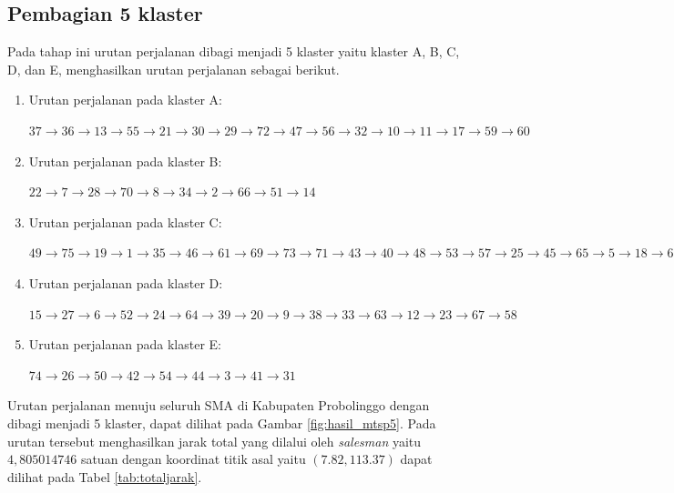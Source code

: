 \subsection{Pembagian 5 klaster}

Pada tahap ini urutan perjalanan dibagi menjadi 5 klaster yaitu klaster A, B, C, D, dan E, menghasilkan urutan perjalanan sebagai berikut.

\begin{enumerate}

\item Urutan perjalanan pada klaster A:

$37\rightarrow36\rightarrow13\rightarrow55\rightarrow21\rightarrow30\rightarrow29\rightarrow72\rightarrow47\rightarrow56\rightarrow32\rightarrow10\rightarrow11\rightarrow17\rightarrow59\rightarrow60$

\item Urutan perjalanan pada klaster B:

$22\rightarrow7\rightarrow28\rightarrow70\rightarrow8\rightarrow34\rightarrow2\rightarrow66\rightarrow51\rightarrow14$

\item Urutan perjalanan pada klaster C:

$49\rightarrow75\rightarrow19\rightarrow1\rightarrow35\rightarrow46\rightarrow61\rightarrow69\rightarrow73\rightarrow71\rightarrow43\rightarrow40\rightarrow48\rightarrow53\rightarrow57\rightarrow25\rightarrow45\rightarrow65\rightarrow5\rightarrow18\rightarrow68\rightarrow16\rightarrow4\rightarrow62$

\item Urutan perjalanan pada klaster D:

$15\rightarrow27\rightarrow6\rightarrow52\rightarrow24\rightarrow64\rightarrow39\rightarrow20\rightarrow9\rightarrow38\rightarrow33\rightarrow63\rightarrow12\rightarrow23\rightarrow67\rightarrow58$

\item Urutan perjalanan pada klaster E:

$74\rightarrow26\rightarrow50\rightarrow42\rightarrow54\rightarrow44\rightarrow3\rightarrow41\rightarrow31$

\end{enumerate}

Urutan perjalanan menuju seluruh SMA di Kabupaten Probolinggo dengan dibagi menjadi 5 klaster, dapat dilihat pada Gambar \ref{fig:hasil_mtsp5}. Pada urutan tersebut menghasilkan jarak total yang dilalui oleh \textit{salesman} yaitu $4,805014746$ satuan dengan koordinat titik asal yaitu $(7.82, 113.37)$ dapat dilihat pada Tabel \ref{tab:totaljarak}.

